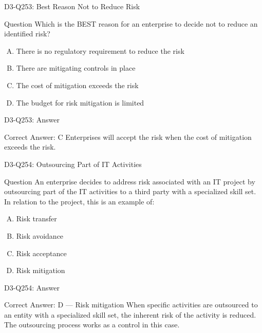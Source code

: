 \documentclass{beamer}
\begin{document}
	\begin{frame}{D3-Q253: Best Reason Not to Reduce Risk}
		\begin{block}{Question}
			Which is the BEST reason for an enterprise to decide not to reduce an identified risk?
		\end{block}
		\begin{enumerate}[(A)]
			\item There is no regulatory requirement to reduce the risk
			\item There are mitigating controls in place
			\item The cost of mitigation exceeds the risk
			\item The budget for risk mitigation is limited
		\end{enumerate}
	\end{frame}
	\begin{frame}{D3-Q253: Answer}
		\begin{block}{Correct Answer: C}
			Enterprises will accept the risk when the cost of mitigation exceeds the risk.
		\end{block}
	\end{frame}
	
	\begin{frame}{D3-Q254: Outsourcing Part of IT Activities}
		\begin{block}{Question}
			An enterprise decides to address risk associated with an IT project by outsourcing part of the IT activities to a third party with a specialized skill set. In relation to the project, this is an example of:
		\end{block}
		\begin{enumerate}[(A)]
			\item Risk transfer
			\item Risk avoidance
			\item Risk acceptance
			\item Risk mitigation
		\end{enumerate}
	\end{frame}
	\begin{frame}{D3-Q254: Answer}
		\begin{block}{Correct Answer: D --- Risk mitigation}
			When specific activities are outsourced to an entity with a specialized skill set, the inherent risk of the activity is reduced. The outsourcing process works as a control in this case.
		\end{block}
	\end{frame}
	
\end{document}
